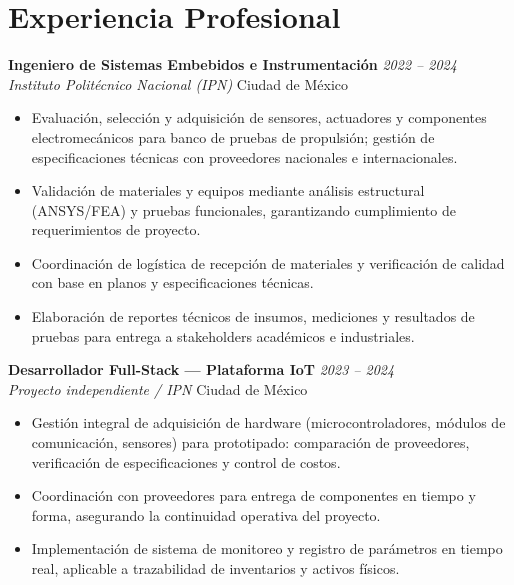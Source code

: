 \documentclass[11pt, a4paper]{article}
\begin{document}
\section{Experiencia Profesional}

\textbf{Ingeniero de Sistemas Embebidos e Instrumentaci\'on} \hfill \textit{2022 -- 2024}\\
\textit{Instituto Polit\'ecnico Nacional (IPN)} \hfill Ciudad de M\'exico
\begin{itemize}[leftmargin=*, itemsep=2pt]
    \item Evaluaci\'on, selecci\'on y adquisici\'on de sensores, actuadores y componentes
          electromec\'anicos para banco de pruebas de propulsi\'on; gesti\'on de
          especificaciones t\'ecnicas con proveedores nacionales e internacionales.
    \item Validaci\'on de materiales y equipos mediante an\'alisis estructural (ANSYS/FEA)
          y pruebas funcionales, garantizando cumplimiento de requerimientos de proyecto.
    \item Coordinaci\'on de log\'istica de recepci\'on de materiales y verificaci\'on de
          calidad con base en planos y especificaciones t\'ecnicas.
    \item Elaboraci\'on de reportes t\'ecnicos de insumos, mediciones y resultados de
          pruebas para entrega a stakeholders acad\'emicos e industriales.
\end{itemize}

\vspace{4pt}
\textbf{Desarrollador Full-Stack --- Plataforma IoT} \hfill \textit{2023 -- 2024}\\
\textit{Proyecto independiente / IPN} \hfill Ciudad de M\'exico
\begin{itemize}[leftmargin=*, itemsep=2pt]
    \item Gesti\'on integral de adquisici\'on de hardware (microcontroladores, m\'odulos
          de comunicaci\'on, sensores) para prototipado: comparaci\'on de proveedores,
          verificaci\'on de especificaciones y control de costos.
    \item Coordinaci\'on con proveedores para entrega de componentes en tiempo y forma,
          asegurando la continuidad operativa del proyecto.
    \item Implementaci\'on de sistema de monitoreo y registro de par\'ametros en tiempo
          real, aplicable a trazabilidad de inventarios y activos f\'isicos.
\end{itemize}
\end{document}
